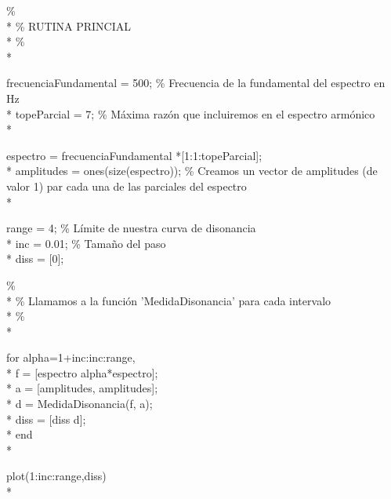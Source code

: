 \documentclass[11pt,a4paper]{article}
\begin{document}
\noindent\%                                          \\*
\%              RUTINA PRINCIAL            \\*
\%                                          \\*

\noindent frecuenciaFundamental = 500; \% Frecuencia de la fundamental del espectro en Hz \\*
\noindent topeParcial = 7; \% Máxima razón que incluiremos en el espectro armónico \\*

\noindent espectro = frecuenciaFundamental *[1:1:topeParcial]; \\*
\noindent amplitudes = ones(size(espectro));      \% Creamos un vector de amplitudes (de valor 1) par cada una de las parciales del espectro \\*

\noindent range = 4;         \% Límite de nuestra curva de disonancia \\*
\noindent inc = 0.01;        \% Tamaño del paso \\*
\noindent diss = [0];

\noindent\% \\*
\% Llamamos a la función 'MedidaDisonancia' para cada intervalo \\*
\% \\*

\noindent for alpha=1+inc:inc:range, \\*
\noindent   f = [espectro alpha*espectro]; \\*
\noindent   a = [amplitudes, amplitudes]; \\*
\noindent   d = MedidaDisonancia(f, a); \\*
\noindent   diss = [diss d]; \\*
\noindent end \\*

\noindent plot(1:inc:range,diss) \\*

\newpage
\end{document}
